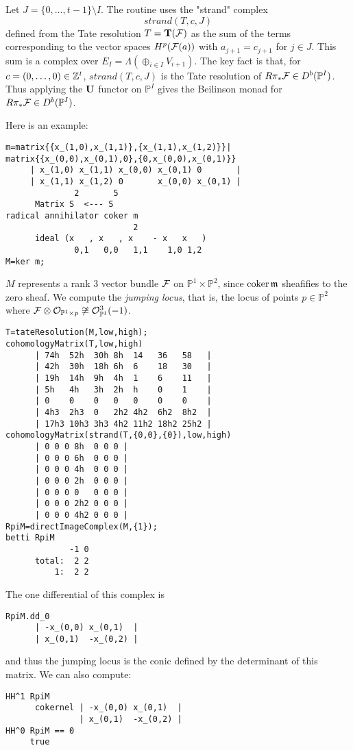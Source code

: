 \documentclass[twoside,12pt, leqno]{amsart}
\def\PP{{\mathbb P}}
\def\bT{{\bf T}}
\def\bU{{\bf U}}
\def\m{{\frak m}}
\begin{document}
Let $J=\{0,\ldots,t-1\} \setminus I$.
The routine uses 
the "strand" complex
$$
strand(T,c,J)
$$
defined from the Tate resolution $T=\bT(\sF)$ as the sum of the terms
corresponding to the vector spaces $H^p({\mathcal F}(a))$ with $a_{j+1}=c_{j+1}$ for $j \in J$.
This sum is a complex over $E_I= \Lambda( \oplus_{i\in I} V_{i+1})$.
 The key fact is that, for $c=(0,\dots,0) \in {\mathbb Z}^t$, 
 $
strand(T,c,J)
$
 is the Tate resolution of $R\pi_* \sF \in D^b(\PP^I)$.
Thus applying the $\bU$ functor on $\PP^I$
gives the Beilinson monad for $R\pi_* \sF \in D^b(\PP^I)$.

Here is an example:
{\small \begin{verbatim}
m=matrix{{x_(1,0),x_(1,1)},{x_(1,1),x_(1,2)}}|
matrix{{x_(0,0),x_(0,1),0},{0,x_(0,0),x_(0,1)}}
     | x_(1,0) x_(1,1) x_(0,0) x_(0,1) 0       |
     | x_(1,1) x_(1,2) 0       x_(0,0) x_(0,1) |
              2       5
      Matrix S  <--- S
radical annihilator coker m
                          2
      ideal (x   , x   , x    - x   x   )
              0,1   0,0   1,1    1,0 1,2
M=ker m;
\end{verbatim}}
 
 \noindent
$M$ represents a rank 3 vector bundle ${\mathcal F}$ on $\PP^1\times \PP^2$, since  $\coker \m$ sheafifies to the zero sheaf. We compute the \emph{jumping locus},  that is, the locus of points $p \in \PP^2$ where $\sF\otimes \sO_{\PP^1\times p} \not\cong \sO_{\PP^1}^3(-1)$.
{\small \begin{verbatim}
T=tateResolution(M,low,high); 
cohomologyMatrix(T,low,high)
      | 74h  52h  30h 8h  14   36   58   |
      | 42h  30h  18h 6h  6    18   30   |
      | 19h  14h  9h  4h  1    6    11   |
      | 5h   4h   3h  2h  h    0    1    |
      | 0    0    0   0   0    0    0    |
      | 4h3  2h3  0   2h2 4h2  6h2  8h2  |
      | 17h3 10h3 3h3 4h2 11h2 18h2 25h2 |
cohomologyMatrix(strand(T,{0,0},{0}),low,high)
      | 0 0 0 8h  0 0 0 |
      | 0 0 0 6h  0 0 0 |
      | 0 0 0 4h  0 0 0 |
      | 0 0 0 2h  0 0 0 |
      | 0 0 0 0   0 0 0 |
      | 0 0 0 2h2 0 0 0 |
      | 0 0 0 4h2 0 0 0 | 
RpiM=directImageComplex(M,{1});
betti RpiM
             -1 0
      total:  2 2
          1:  2 2
\end{verbatim}
\noindent The one differential of this complex is
\begin{verbatim}
RpiM.dd_0
      | -x_(0,0) x_(0,1)  |
      | x_(0,1)  -x_(0,2) |
\end{verbatim}
\noindent and thus the jumping locus is the conic defined by the determinant of this matrix. We can also compute:
\begin{verbatim}
HH^1 RpiM
      cokernel | -x_(0,0) x_(0,1)  |
               | x_(0,1)  -x_(0,2) |
HH^0 RpiM == 0 
     true 
 \end{verbatim}}
\end{document}
